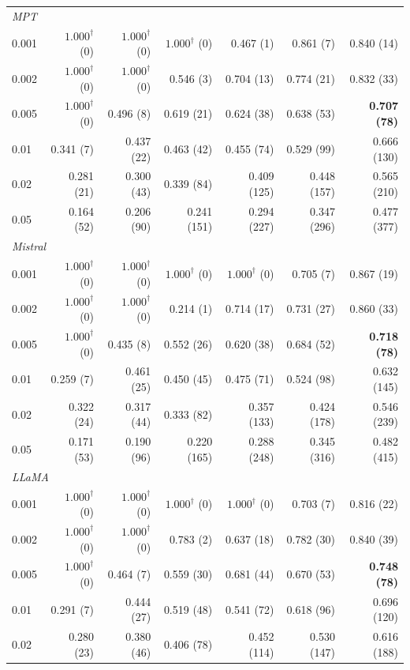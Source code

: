 \documentclass[11pt]{article}
\begin{document}
\begin{table}[!htbp]
\begin{tabular}{lrrrrrr}
\multicolumn{7}{l}{\textit{MPT}} \\
0.001 & $1.000^\dagger$ (0)  & $1.000^\dagger$ (0)  & $1.000^\dagger$ (0)  & 0.467 (1)   & 0.861 (7)   & 0.840 (14) \\
0.002 & $1.000^\dagger$ (0)  & $1.000^\dagger$ (0)  & 0.546 (3)   & 0.704 (13)  & 0.774 (21)  & 0.832 (33) \\
0.005 & $1.000^\dagger$ (0)  & 0.496 (8)   & 0.619 (21)  & 0.624 (38)  & 0.638 (53)  & \textbf{0.707 (78)} \\
0.01  & 0.341 (7)   & 0.437 (22)  & 0.463 (42)  & 0.455 (74)  & 0.529 (99)  & 0.666 (130) \\
0.02  & 0.281 (21)  & 0.300 (43)  & 0.339 (84)  & 0.409 (125) & 0.448 (157) & 0.565 (210) \\
0.05  & 0.164 (52)  & 0.206 (90)  & 0.241 (151) & 0.294 (227) & 0.347 (296) & 0.477 (377) \\
\midrule
\multicolumn{7}{l}{\textit{Mistral}} \\
0.001 & $1.000^\dagger$ (0)  & $1.000^\dagger$ (0)  & $1.000^\dagger$ (0)  & $1.000^\dagger$ (0)  & 0.705 (7)   & 0.867 (19) \\
0.002 & $1.000^\dagger$ (0)  & $1.000^\dagger$ (0)  & 0.214 (1)   & 0.714 (17)  & 0.731 (27)  & 0.860 (33) \\
0.005 & $1.000^\dagger$ (0)  & 0.435 (8)   & 0.552 (26)  & 0.620 (38)  & 0.684 (52)  & \textbf{0.718 (78)} \\
0.01  & 0.259 (7)   & 0.461 (25)  & 0.450 (45)  & 0.475 (71)  & 0.524 (98)  & 0.632 (145) \\
0.02  & 0.322 (24)  & 0.317 (44)  & 0.333 (82)  & 0.357 (133) & 0.424 (178) & 0.546 (239) \\
0.05  & 0.171 (53)  & 0.190 (96)  & 0.220 (165) & 0.288 (248) & 0.345 (316) & 0.482 (415) \\
\midrule
\multicolumn{7}{l}{\textit{LLaMA}} \\
0.001 & $1.000^\dagger$ (0)  & $1.000^\dagger$ (0)  & $1.000^\dagger$ (0)  & $1.000^\dagger$ (0)  & 0.703 (7)   & 0.816 (22) \\
0.002 & $1.000^\dagger$ (0)  & $1.000^\dagger$ (0)  & 0.783 (2)   & 0.637 (18)  & 0.782 (30)  & 0.840 (39) \\
0.005 & $1.000^\dagger$ (0)  & 0.464 (7)   & 0.559 (30)  & 0.681 (44)  & 0.670 (53)  & \textbf{0.748 (78)} \\
0.01  & 0.291 (7)   & 0.444 (27)  & 0.519 (48)  & 0.541 (72)  & 0.618 (96)  & 0.696 (120) \\
0.02  & 0.280 (23)  & 0.380 (46)  & 0.406 (78)  & 0.452 (114) & 0.530 (147) & 0.616 (188) \\

\end{tabular}
\end{table}
\end{document}
